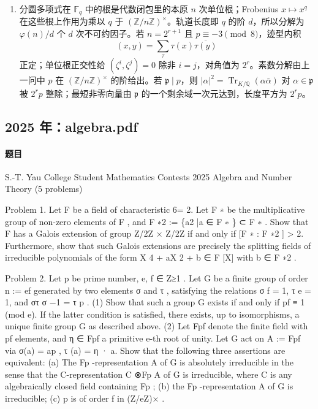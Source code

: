 \documentclass[UTF8,12pt]{ctexart}
\begin{document}
\begin{enumerate}[label=\textbf{\arabic*.},leftmargin=2.2em]
\[
a^x=\exp(x\log a),\quad x\in\mathbb Z_p.
\]
要延拓到全 \( \mathbb Q_p\) 并保持 \(a^{x+y}=a^xa^y\)，除平凡 \(a=1\) 外不可能，因为 \(\mathbb Q_p\) 可被任意 \(p^r\) 整除，要求 \(a\) 有兼容的所有 \(p^r\) 次根并连续趋于 \(1\)，在 \(\mathbb Q_p^\times\) 中只给 \(a=1\)。
\item 分圆多项式在 \(\mathbb F_q\) 中的根是代数闭包里的本原 \(n\) 次单位根；Frobenius \(x\mapsto x^q\) 在这些根上作用为乘以 \(q\) 于 \((\mathbb Z/n\mathbb Z)^\times\)。轨道长度即 \(q\) 的阶 \(d\)，所以分解为 \(\varphi(n)/d\) 个 \(d\) 次不可约因子。若 \(n=2^{r+1}\) 且 \(p\equiv-3\pmod8\)，迹型内积
\[
(x,y)=\sum_\tau \tau(x)\overline{\tau(y)}
\]
正定；单位根正交性给 \((\zeta^i,\zeta^j)=0\) 除非 \(i=j\)，对角值为 \(2^r\)。素数分解由上一问中 \(p\) 在 \((\mathbb Z/n\mathbb Z)^\times\) 的阶给出。若 \(\mathfrak p\mid p\)，则 \(|\alpha|^2=\operatorname{Tr}_{K/\mathbb Q}(\alpha\bar\alpha)\) 对 \(\alpha\in\mathfrak p\) 被 \(2^rp\) 整除；最短非零向量由 \(\mathfrak p\) 的一个剩余域一次元达到，长度平方为 \(2^rp\)。
\end{enumerate}

\subsection{2025 年：algebra.pdf}
\paragraph{题目}
S.-T. Yau College Student Mathematics Contests 2025 Algebra and Number Theory (5 problems)

Problem 1. Let F be a field of characteristic 6= 2. Let F ∗ be the multiplicative group of non-zero elements of F , and F ∗2 := \{a2 |a ∈ F ∗ \} ⊂ F ∗ . Show that F has a Galois extension of group Z/2Z × Z/2Z if and only if [F ∗ : F ∗2 ] > 2. Furthermore, show that such Galois extensions are precisely the splitting fields of irreducible polynomials of the form X 4 + aX 2 + b ∈ F [X] with b ∈ F ∗2 .

Problem 2. Let p be prime number, e, f ∈ Z≥1 . Let G be a finite group of order n := ef generated by two elements σ and τ , satisfying the relations σ f = 1, τ e = 1, and στ σ −1 = τ p . (1) Show that such a group G exists if and only if pf ≡ 1 (mod e). If the latter condition is satisfied, there exists, up to isomorphisms, a unique finite group G as described above. (2) Let Fpf denote the finite field with pf elements, and η ∈ Fpf a primitive e-th root of unity. Let G act on A := Fpf via σ(a) = ap , τ (a) = η · a. Show that the following three assertions are equivalent: (a) The Fp -representation A of G is absolutely irreducible in the sense that the C-representation C ⊗Fp A of G is irreducible, where C is any algebraically closed field containing Fp ; (b) the Fp -representation A of G is irreducible; (c) p is of order f in (Z/eZ)× .
\end{document}
